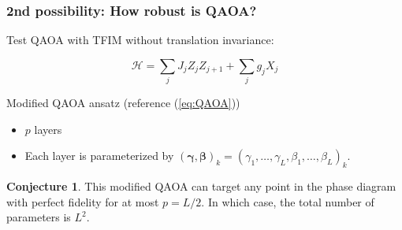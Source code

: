 \documentclass{beamer}
\theoremstyle{definition}
\newtheorem{conjecture}{Conjecture}[section]
\begin{document}

\begin{frame}
\frametitle{2nd possibility: How robust is QAOA?}

Test QAOA with TFIM without translation invariance:

\begin{equation}\label{eq:QAOAmod}
\mathcal{H} = \sum_{j}J_j Z_j Z_{j+1} + \sum_j g_j  X_j
\end{equation}


Modified QAOA ansatz (reference (\ref{eq:QAOA}))
\begin{itemize}
	\item $p$ layers
	\item Each layer is parameterized by $(\bm\gamma,\bm\beta)_k = (\gamma_{1},\dots,\gamma_{L},\beta_{1},\dots,\beta_{L} )_k$.
\end{itemize}


\begin{conjecture}
	This modified QAOA can target any point in the phase diagram with perfect fidelity for at most $p = L/2$. In which case, the total number of parameters is $L^2$.  
\end{conjecture}




\end{frame}


\end{document}
